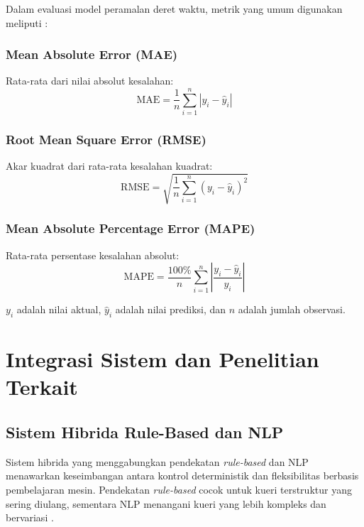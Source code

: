 Dalam evaluasi model peramalan deret waktu, metrik yang umum digunakan meliputi \parencite{sirisha2022profit,sunendar2025comparison}:

\subsubsection{Mean Absolute Error (MAE)}
Rata-rata dari nilai absolut kesalahan:
\begin{equation}
\text{MAE} = \frac{1}{n} \sum_{i=1}^n |y_i - \hat{y}_i|
\end{equation}

\subsubsection{Root Mean Square Error (RMSE)}
Akar kuadrat dari rata-rata kesalahan kuadrat:
\begin{equation}
\text{RMSE} = \sqrt{\frac{1}{n} \sum_{i=1}^n (y_i - \hat{y}_i)^2}
\end{equation}

\subsubsection{Mean Absolute Percentage Error (MAPE)}
Rata-rata persentase kesalahan absolut:
\begin{equation}
\text{MAPE} = \frac{100\%}{n} \sum_{i=1}^n \left|\frac{y_i - \hat{y}_i}{y_i}\right|
\end{equation}

$y_i$ adalah nilai aktual, $\hat{y}_i$ adalah nilai prediksi, dan $n$ adalah jumlah observasi.

\section{Integrasi Sistem dan Penelitian Terkait}

\subsection{Sistem Hibrida Rule-Based dan NLP}

Sistem hibrida yang menggabungkan pendekatan \textit{rule-based} dan NLP menawarkan keseimbangan antara kontrol deterministik dan fleksibilitas berbasis pembelajaran mesin. Pendekatan \textit{rule-based} cocok untuk kueri terstruktur yang sering diulang, sementara NLP menangani kueri yang lebih kompleks dan bervariasi \parencite{shah2024ai}.

